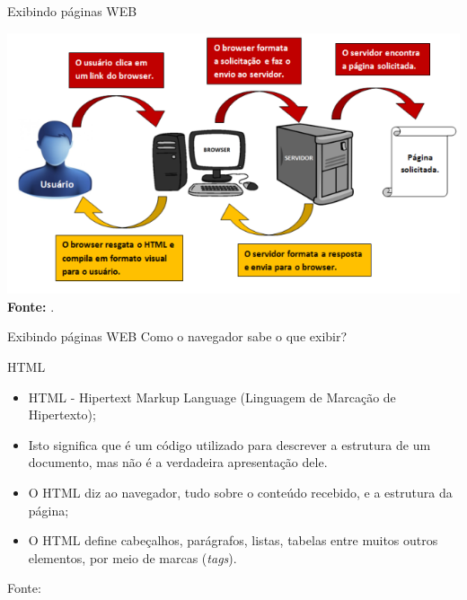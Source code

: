 \documentclass{beamer}
\begin{document}
\begin{frame}{Exibindo páginas WEB}
		\begin{center}
\includegraphics[height=0.65\paperheight]{fig/aula1/funcionamentoweb.jpg} \\
    		\tiny \textbf{Fonte:} \cite{freeman2008use}.
		\end{center}
\end{frame}
\begin{frame}{Exibindo páginas WEB}
  Como o navegador sabe o que exibir?
  \begin{block}{HTML}
    \begin{itemize}
      \item HTML - Hipertext Markup Language (Linguagem de Marcação de 
Hipertexto);
       \item Isto significa que é um código utilizado para descrever a 
estrutura de um documento, mas não é a verdadeira apresentação dele.
       \item O HTML diz ao navegador, tudo sobre o conteúdo recebido, e 
a estrutura da página;
       \item O HTML define cabeçalhos, parágrafos, listas, tabelas entre 
muitos outros elementos, por meio de marcas (\textit{tags}).
    \end{itemize}
    \tiny{Fonte: \cite{marinho2016}}
  \end{block}
\end{frame}
\end{document}
